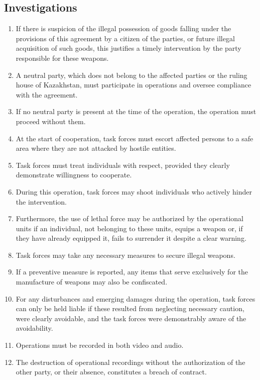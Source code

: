 \documentclass{article}
\begin{document}
\subsection{Investigations}
\begin{enumerate}[(1)]
    \item If there is suspicion of the illegal possession of goods falling under the provisions of this agreement by a citizen of the parties, or future illegal acquisition of such goods, this justifies a timely intervention by the party responsible for these weapons.
    \item A neutral party, which does not belong to the affected parties or the ruling house of Kazakhstan, must participate in operations and oversee compliance with the agreement.
    \item If no neutral party is present at the time of the operation, the operation must proceed without them.
    \item At the start of cooperation, task forces must escort affected persons to a safe area where they are not attacked by hostile entities.
    \item Task forces must treat individuals with respect, provided they clearly demonstrate willingness to cooperate.
    \item During this operation, task forces may shoot individuals who actively hinder the intervention.
    \item Furthermore, the use of lethal force may be authorized by the operational units if an individual, not belonging to these units, equips a weapon or, if they have already equipped it, fails to surrender it despite a clear warning.    \item Task forces may take any necessary measures to secure illegal weapons.
    \item If a preventive measure is reported, any items that serve exclusively for the manufacture of weapons may also be confiscated.
    \item For any disturbances and emerging damages during the operation, task forces can only be held liable if these resulted from neglecting necessary caution, were clearly avoidable, and the task forces were demonstrably aware of the avoidability.
    \item Operations must be recorded in both video and audio.
    \item The destruction of operational recordings without the authorization of the other party, or their absence, constitutes a breach of contract.
\end{enumerate}
\end{document}
